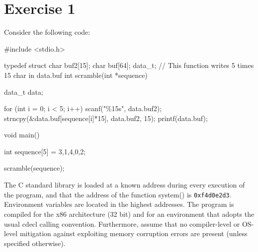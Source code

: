\section{Exercise 1}

Consider the following code: 
\begin{verbnobox}[\verbarg]
#include <stdio.h>

typedef struct 
{
    char buf2[15];
    char buf[64];
} data_t;
// This function writes 5 times 15 char in data.buf
int scramble(int *sequence) 
{
    data_t data;

    for (int i = 0; i < 5; i++)
    {
        scanf("\%15s", data.buf2);
        strncpy(&data.buf[sequence[i]*15], data.buf2, 15);
        printf(data.buf);
    }
}

void main() 
{
    int sequence[5] = {3,1,4,0,2};

    scramble(sequence);
}
\end{verbnobox}
The C standard library is loaded at a known address during every execution of the program, and that the address of the function system() is \texttt{0xf4d0e2d3}.
Environment variables are located in the highest addresses. 
The program is compiled for the x86 architecture (32 bit) and for an environment that adopts the usual cdecl calling convention. 
Furthermore, assume that no compiler-level or OS-level mitigation against exploiting memory corruption errors are present (unless specified otherwise).
